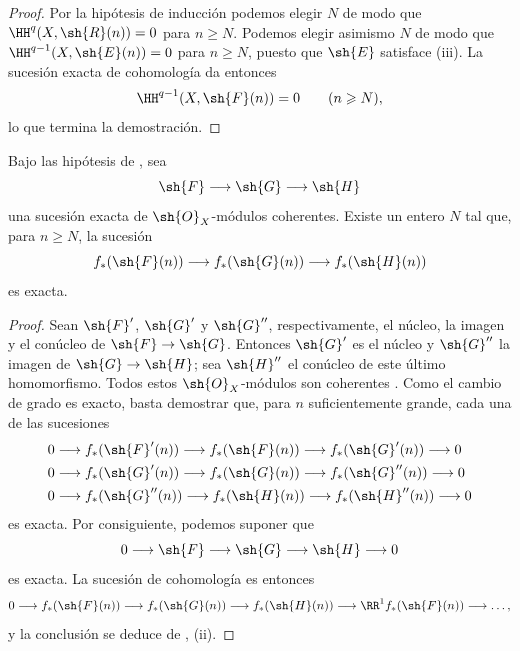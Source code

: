 \documentclass[oneside]{amsart}
\makeatletter
\renewcommand{\geq}{\geqslant}
\newcommand{\ega@arrow}[2]{\mathchoice{#1}{#2}{#2}{#2}}
\renewcommand{\to}{\ega@arrow{\longrightarrow}{\rightarrow}}
\newcommand{\oldpage}[2][]{{\marginnote{\normalfont\textbf{#1}~|~#2}}\ignorespaces}
\let\EGAOriginalLabel\label
\renewcommand{\label}[1]{\phantomsection\EGAOriginalLabel{#1}}
\makeatother
\begin{document}
\begin{proof}
Por la hipótesis de inducción podemos elegir $N$ de modo que $\HH^q(X,\sh{R}(n))=0$ para $n\geq N$.
Podemos elegir asimismo $N$ de modo que $\HH^{q-1}(X,\sh{E}(n))=0$ para $n\geq N$, puesto que $\sh{E}$ satisface (iii).
La sucesión exacta de cohomología da entonces
\[
  \HH^{q-1}(X,\sh{F}(n))=0
  \qquad(n\geq N),
\]
lo que termina la demostración.
\end{proof}

\begin{corollary}[2.2.3]
\label{III.2.2.3}
Bajo las hipótesis de \textup{}, sea
\[
  \sh{F}\longrightarrow\sh{G}\longrightarrow\sh{H}
\]
una sucesión exacta de $\sh{O}_X$-módulos coherentes.
Existe un entero $N$ tal que, para $n\geq N$, la sucesión
\[
  f_*(\sh{F}(n))
  \longrightarrow f_*(\sh{G}(n))
  \longrightarrow f_*(\sh{H}(n))
\]
es exacta.
\end{corollary}

\begin{proof}
Sean $\sh{F}'$, $\sh{G}'$ y $\sh{G}''$, respectivamente, el núcleo, la imagen y el conúcleo de $\sh{F}\to\sh{G}$.
Entonces $\sh{G}'$ es el núcleo y $\sh{G}''$ la imagen de $\sh{G}\to\sh{H}$; sea $\sh{H}''$ el conúcleo de este último homomorfismo.
Todos estos $\sh{O}_X$-módulos son coherentes .
Como el cambio de grado es exacto, basta demostrar que, para $n$ suficientemente grande, cada una de las sucesiones
\begin{align*}
  0&\longrightarrow f_*(\sh{F}'(n))
    \longrightarrow f_*(\sh{F}(n))
    \longrightarrow f_*(\sh{G}'(n))
    \longrightarrow0\\
  0&\longrightarrow f_*(\sh{G}'(n))
    \longrightarrow f_*(\sh{G}(n))
    \longrightarrow f_*(\sh{G}''(n))
    \longrightarrow0\\
  0&\longrightarrow f_*(\sh{G}''(n))
    \longrightarrow f_*(\sh{H}(n))
    \longrightarrow f_*(\sh{H}''(n))
    \longrightarrow0
\end{align*}
es exacta.
Por consiguiente, podemos suponer que
\[
  0\longrightarrow\sh{F}\longrightarrow\sh{G}
   \longrightarrow\sh{H}\longrightarrow0
\]
es exacta.
La sucesión de cohomología es entonces
\[
  0\longrightarrow f_*(\sh{F}(n))
  \longrightarrow f_*(\sh{G}(n))
  \longrightarrow f_*(\sh{H}(n))
  \longrightarrow \RR^1f_*(\sh{F}(n))
  \longrightarrow\ldots,
\]
y la conclusión se deduce de , (ii).
\end{proof}

\oldpage[III]{102}
\end{document}
